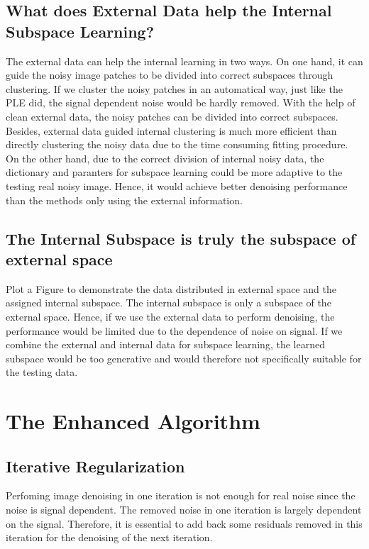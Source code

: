 \documentclass[10pt,twocolumn,letterpaper]{article}
\begin{document}
\subsection{What does External Data help the Internal Subspace Learning?}
The external data can help the internal learning in two ways. On one hand, it can guide the noisy image patches to be divided into correct subspaces through clustering. If we cluster the noisy patches in an automatical way, just like the PLE \cite{ple} did, the signal dependent noise would be hardly removed. With the help of clean external data, the noisy patches can be divided into correct subspaces. Besides, external data guided internal clustering is much more efficient than directly clustering the noisy data due to the time consuming fitting procedure. On the other hand, due to the correct division of internal noisy data, the dictionary and paranters for subspace learning could be more adaptive to the testing real noisy image. Hence, it would achieve better denoising performance than the methods only using the external information.

\subsection{The Internal Subspace is truly the subspace of external space}
Plot a Figure to demonstrate the data distributed in external space and the assigned internal subspace. The internal subspace is only a subspace of the external space. Hence, if we use the external data to perform denoising, the performance would be limited due to the dependence of noise on signal. If we combine the external and internal data for subspace learning, the learned subspace would be too generative and would therefore not specifically suitable for the testing data.

\section{The Enhanced Algorithm}

\subsection{Iterative Regularization}
Perfoming image denoising in one iteration is not enough for real noise since the noise is signal dependent. The removed noise in one iteration is largely dependent on the signal. Therefore, it is essential to add back some residuals removed in this iteration for the denoising of the next iteration. 
\end{document}

